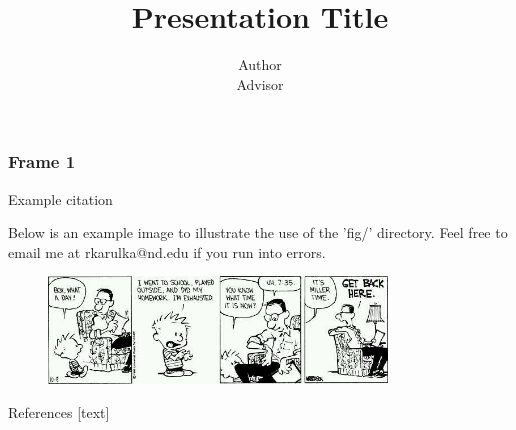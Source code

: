 \documentclass[10pt]{beamer}
\begin{document}
	\author[]{Author \\ [1ex] {\small  Advisor}}
	\title[]{ Presentation Title }
	\date{}
\begin{frame}
	\maketitle
\end{frame}

\begin{frame}\frametitle{Frame 1}
Example citation \cite{liu2015dynamic}

Below is an example image to illustrate the use of the 'fig/' directory. Feel free to email me at rkarulka@nd.edu if you run into errors.

\begin{figure}
	\centering
	\includegraphics[width=9cm]{fig/ch.jpg}
\end{figure}
\end{frame}

\appendix
\begin{frame}{References}
\scriptsize
{}[text]


\end{frame}
\end{document}

